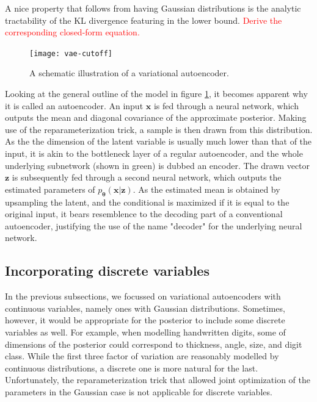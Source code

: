 \documentclass{report}
\newcommand\todo[1]{\textcolor{red}{#1}}
\begin{document}
\noindent A nice property that follows from having Gaussian distributions is the analytic tractability of the KL divergence featuring in the lower bound. \todo{Derive the corresponding closed-form equation.} \\

\begin{figure}
\begin{center}
\texttt{[image: vae-cutoff]}
\caption{A schematic illustration of a variational autoencoder.}
\label{fig:vae}
\end{center}
\end{figure}

\noindent Looking at the general outline of the model in figure \ref{fig:vae}, it becomes apparent why it is called an autoencoder. An input $\boldsymbol{x}$ is fed through a neural network, which outputs the mean and diagonal covariance of the approximate posterior. Making use of the reparameterization trick, a sample is then drawn from this distribution. As the the dimension of the latent variable is usually much lower than that of the input, it is akin to the bottleneck layer of a regular autoencoder, and the whole underlying subnetwork (shown in green) is dubbed an encoder. The drawn vector $\boldsymbol{z}$ is subsequently fed through a second neural network, which outputs the estimated parameters of $p_{\boldsymbol{\theta}}(\boldsymbol{x}|\boldsymbol{z})$. As the estimated mean is obtained by upsampling the latent, and the conditional is maximized if it is equal to the original input, it bears resemblence to the decoding part of a conventional autoencoder, justifying the use of the name "decoder" for the underlying neural network.

\subsection{Incorporating discrete variables}

In the previous subsections, we focussed on variational autoencoders with continuous variables, namely ones with Gaussian distributions. Sometimes, however, it would be appropriate for the posterior to include some discrete variables as well. For example, when modelling handwritten digits, some of dimensions of the posterior could correspond to thickness, angle, size, and digit class. While the first three factor of variation are reasonably modelled by continuous distributions, a discrete one is more natural for the last. Unfortunately, the reparameterization trick that allowed joint optimization of the parameters in the Gaussian case is not applicable for discrete variables. \\
\end{document}
